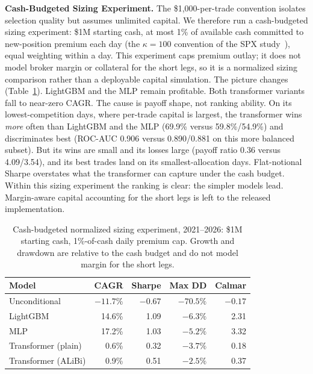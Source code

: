 \documentclass[sigconf,review]{acmart}
\begin{document}
\medskip\noindent\textbf{Cash-Budgeted Sizing Experiment.}
\label{sec:capitalscaled}
The \$1{,}000-per-trade convention isolates selection quality but assumes unlimited capital. We therefore run a cash-budgeted sizing experiment: \$1M starting cash, at most 1\% of available cash committed to new-position premium each day (the $\kappa=100$ convention of the SPX study~\cite{glasserman2025tp2}), equal weighting within a day. This experiment caps premium outlay; it does not model broker margin or collateral for the short legs, so it is a normalized sizing comparison rather than a deployable capital simulation. The picture changes (Table~\ref{tab:capitalscaled}). LightGBM and the MLP remain profitable. Both transformer variants fall to near-zero CAGR. The cause is payoff shape, not ranking ability. On its lowest-competition days, where per-trade capital is largest, the transformer wins \emph{more} often than LightGBM and the MLP (69.9\% versus 59.8\%/54.9\%) and discriminates best (ROC-AUC 0.906 versus 0.890/0.881 on this more balanced subset). But its wins are small and its losses large (payoff ratio 0.36 versus 4.09/3.54), and its best trades land on its smallest-allocation days. Flat-notional Sharpe overstates what the transformer can capture under the cash budget. Within this sizing experiment the ranking is clear: the simpler models lead. Margin-aware capital accounting for the short legs is left to the released implementation.

\begin{table}[t]
\centering
\footnotesize
\begin{tabular}{lrrrr}
\toprule
Model & CAGR & Sharpe & Max DD & Calmar \\
\midrule
Unconditional & $-11.7\%$ & $-0.67$ & $-70.5\%$ & $-0.17$ \\
LightGBM & 14.6\% & 1.09 & $-6.3\%$ & 2.31 \\
MLP & 17.2\% & 1.03 & $-5.2\%$ & 3.32 \\
Transformer (plain) & 0.6\% & 0.32 & $-3.7\%$ & 0.18 \\
Transformer (ALiBi) & 0.9\% & 0.51 & $-2.5\%$ & 0.37 \\
\bottomrule
\end{tabular}
\caption{Cash-budgeted normalized sizing experiment, 2021--2026: \$1M starting cash, 1\%-of-cash daily premium cap. Growth and drawdown are relative to the cash budget and do not model margin for the short legs.}
\label{tab:capitalscaled}
\end{table}
\end{document}
